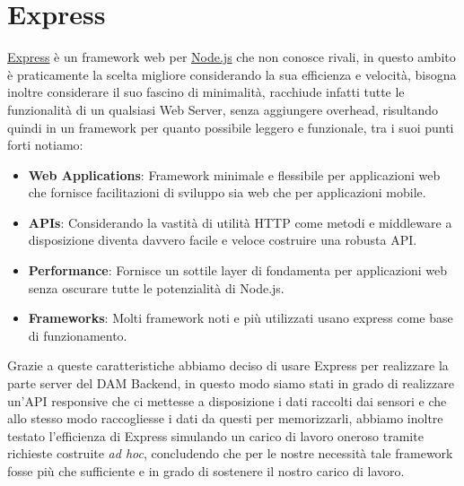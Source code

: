 \documentclass[a4paper,12pt]{report}
\newcommand{\node}{\href{https://nodejs.org/it/}{Node.js} }
\newcommand{\express}{\href{https://expressjs.com/it/}{Express} }
\begin{document}
\section{Express}
\express è un framework web per \node che non conosce rivali, in questo ambito è praticamente la scelta migliore considerando la sua efficienza e velocità, bisogna inoltre considerare il suo fascino di minimalità, racchiude infatti tutte le funzionalità di un qualsiasi Web Server, senza aggiungere overhead, risultando quindi in un framework per quanto possibile leggero e funzionale, tra i suoi punti forti notiamo:
\begin{itemize}
    \item \textbf{Web Applications}: Framework minimale e flessibile per applicazioni web che fornisce facilitazioni di sviluppo sia web che per applicazioni mobile.
    \item \textbf{APIs}: Considerando la vastità di utilità HTTP come metodi e middleware a disposizione diventa davvero facile e veloce costruire una robusta API.
    \item \textbf{Performance}: Fornisce un sottile layer di fondamenta per applicazioni web senza oscurare tutte le potenzialità di Node.js.
    \item \textbf{Frameworks}: Molti framework noti e più utilizzati usano express come base di funzionamento.
\end{itemize}
Grazie a queste caratteristiche abbiamo deciso di usare Express per realizzare la parte server del DAM Backend, in questo modo siamo stati in grado di realizzare un'API responsive che ci mettesse a disposizione i dati raccolti dai sensori e che allo stesso modo raccogliesse i dati da questi per memorizzarli, abbiamo inoltre testato l'efficienza di Express simulando un carico di lavoro oneroso tramite richieste costruite \emph{ad hoc}, concludendo che per le nostre necessità tale framework fosse più che sufficiente e in grado di sostenere il nostro carico di lavoro.
\end{document}
